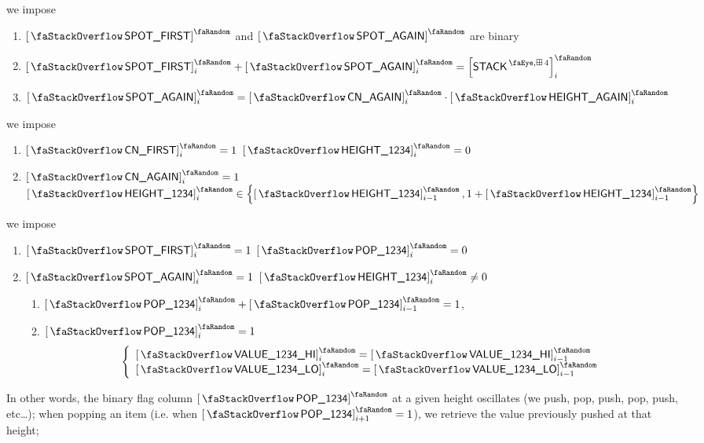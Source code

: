 \begin{description}
		we impose
		\begin{enumerate}
			\item $\stackSpotFirst$ and $\stackSpotAgain$ are binary
			\item $\stackSpotFirst_{i} + \stackSpotAgain_{i} = \order{\peekStackFour}_{i}$
			\item $\stackSpotAgain_{i} = \stackContextAgain_{i} \cdot \stackHeightAgain_{i}$
		\end{enumerate}
	\item[First and repeat context encounter:]
		we impose
		\begin{enumerate}
			\item \If $\stackContextFirst_{i} = 1$ \Then $\order{\stackItemHeight{\col{1234}}}_{i} = 0$
			\item \If $\stackContextAgain_{i} = 1$ \Then $\order{\stackItemHeight{\col{1234}}}_{i}
				\in \left \{ \order{\stackItemHeight{\col{1234}}}_{i - 1}, 1 + \order{\stackItemHeight{\col{1234}}}_{i - 1} \right \}$
		\end{enumerate}
	\item[First and repeat spot encounter:]
		we impose
		\begin{enumerate}
			\item \If $\stackSpotFirst_{i} = 1$ \Then $\order{\stackItemPop{\col{1234}}}_{i} = 0$
			\item \If $\stackSpotAgain_{i} = 1$ \et $\order{\stackItemHeight{\col{1234}}}_{i} \neq 0$ \Then
				\begin{enumerate}
					\item $\order{\stackItemPop{\col{1234}}}_{i} + \order{\stackItemPop{\col{1234}}}_{i - 1} = 1$,
					\item \If $\order{\stackItemPop{\col{1234}}}_{i} = 1$ \Then
						\[
							\left\{ \begin{array}{l}
								\order{\stackItemValHi{\col{1234}}}_{i} = \order{\stackItemValHi{\col{1234}}}_{i - 1} \\
								\order{\stackItemValLo{\col{1234}}}_{i} = \order{\stackItemValLo{\col{1234}}}_{i - 1} \\
							\end{array} \right.
						\]
				\end{enumerate}
		\end{enumerate}
\end{description}
In other words, the binary flag column $\order{\stackItemPop{\col{1234}}}$ at a given height oscillates (we push, pop, push, pop, push, etc\dots{}); when popping an item (i.e. when $\order{\stackItemPop{\col{1234}}}_{i+1} = 1$), we retrieve the value previously pushed at that height;
